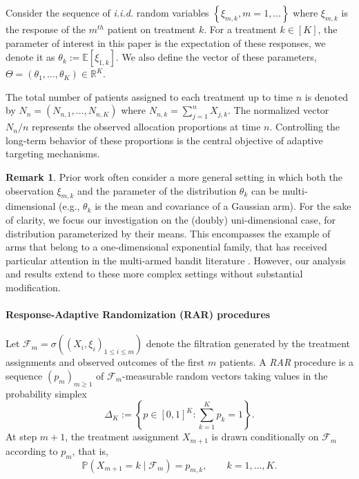 \documentclass[11pt]{article}
\theoremstyle{plain}
\theoremstyle{definition}
\newtheorem{remark}[theorem]{Remark}
\begin{document}
Consider the sequence of \textit{i.i.d.} random variables \(\left\{\xi_{m,k}, m=1, \dots\right\}\)  where \(\xi_{m,k}\) is the response of the \(m^{th}\) patient on treatment \(k\). For a treatment $k \in [K]$, the parameter of interest in this paper is the expectation of these responses, we denote it as \(\theta_k := \mathbb{E}\left[\xi_{1,k}\right]\). We also define the vector of these parameters, \(\Theta = (\theta_1, \ldots, \theta_K) \in \mathbb{R}^K\).

The total number of patients assigned to each treatment up to time $n$ is denoted by \(N_n = (N_{n,1}, \ldots, N_{n,K})\) where \(N_{n,k} = \sum_{j=1}^n X_{j,k}\).
The normalized vector $N_n/n$ represents the observed allocation proportions at time $n$. Controlling the long-term behavior of these proportions is the central objective of adaptive targeting mechanisms.

\begin{remark}
Prior work often consider a more general setting in which both the observation $\xi_{m,k}$ %
and the parameter of the distribution $\theta_k$ can be multi-dimensional (e.g., $\theta_k$ is the mean and covariance of a Gaussian arm). %
For the sake of clarity, we focus our investigation on the (doubly) uni-dimensional case, for distribution parameterized by their means. This encompasses the example of arms that belong to a one-dimensional exponential family, that has received particular attention in the multi-armed bandit literature \citep{KLUCBJournal,garivier2016optimal}. However,  our analysis and results extend to these more complex settings without substantial modification.
\end{remark}

\paragraph*{Response-Adaptive Randomization (RAR) procedures}

Let $\mathcal{F}_m = \sigma\!\left((X_i,\xi_i)_{1 \le i \le m}\right)$ 
denote the filtration generated by the treatment assignments and observed 
outcomes of the first $m$ patients. A \textit{RAR} procedure is a sequence
$(p_m)_{m\ge1}$ of $\mathcal{F}_m$-measurable random vectors taking values 
in the probability simplex
\[
\Delta_K := \left\{ p \in [0,1]^K : \sum_{k=1}^K p_k = 1 \right\}.
\]
At step $m+1$, the treatment assignment $X_{m+1}$ is drawn conditionally 
on $\mathcal{F}_m$ according to $p_m$, that is,
\[
\mathbb{P}(X_{m+1} = k \mid \mathcal{F}_m) = p_{m,k},
\qquad k = 1,\dots,K.
\]
\end{document}
